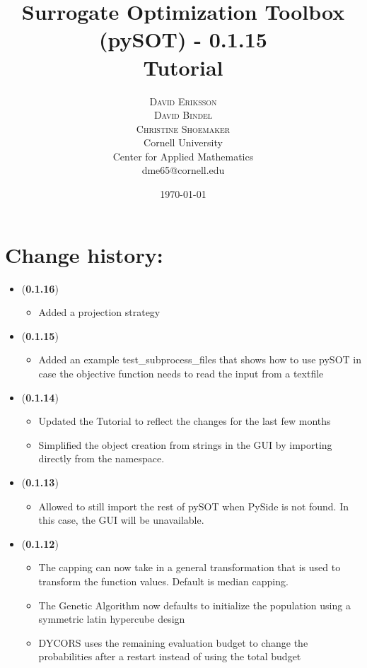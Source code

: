 \documentclass[]{article}
\title{\vspace{-15mm}%
	\fontsize{18pt}{10pt}\selectfont
	\textbf{Surrogate Optimization Toolbox (pySOT) - 0.1.15 \\ Tutorial}
	}
\author{%
	\Large\textsc{David Eriksson} \\[2mm]
	\Large\textsc{David Bindel} \\[2mm]
	\Large\textsc{Christine Shoemaker} \\[2mm]
		\normalsize	Cornell University \\
	\normalsize Center for Applied Mathematics \\
	\normalsize	dme65@cornell.edu \\ 
	}
\date{\today}
\begin{document}
\fontsize{12}{14}\rm

\maketitle
\thispagestyle{fancy}
\tableofcontents
\newpage

\section{Change history:}
\begin{itemize}

\item (\textbf{0.1.16})
\begin{itemize}
\item Added a projection strategy
\end{itemize}

\item (\textbf{0.1.15})
\begin{itemize}
\item Added an example test\_subprocess\_files that shows how to use pySOT in case the objective function needs to read the input from a textfile
\end{itemize}

\item (\textbf{0.1.14}) 
\begin{itemize}
\item Updated the Tutorial to reflect the changes for the last few months
\item Simplified the object creation from strings in the GUI by importing directly from the namespace.
\end{itemize}

\item (\textbf{0.1.13}) 
\begin{itemize}
\item Allowed to still import the rest of pySOT when PySide is not found. In this case, the GUI will be unavailable.
\end{itemize}

\item (\textbf{0.1.12}) 
\begin{itemize}
\item The capping can now take in a general transformation that is used to transform the function values. Default is median capping.
\item The Genetic Algorithm now defaults to initialize the population using a symmetric latin hypercube design
\item DYCORS uses the remaining evaluation budget to change the probabilities after a restart instead of using the total budget 
\end{itemize}


\end{itemize}
\end{document}

